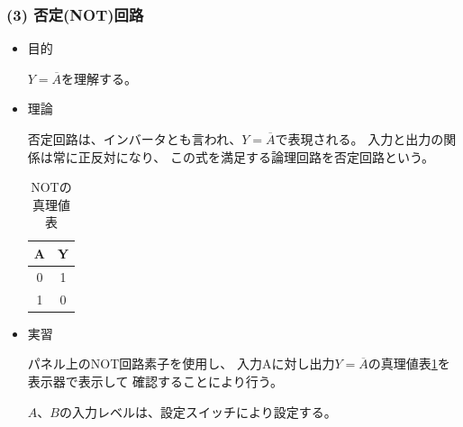 \documentclass[12pt]{jarticle}
\begin{document}
\subsubsection*{(3) 否定(NOT)回路}
\begin{itemize}
    \item 目的

          $Y = \overline{A}$を理解する。

    \item 理論

          否定回路は、インバータとも言われ、$Y = \overline{A}$で表現される。
          入力と出力の関係は常に正反対になり、
          この式を満足する論理回路を否定回路という。

          \begin{table}[h]
              \caption{NOTの真理値表}
              \begin{center}
                  \begin{tabular}{|c|c|}
                      \hline
                      A & Y \\
                      \hline
                      0 & 1 \\
                      \hline
                      1 & 0 \\
                      \hline
                  \end{tabular}
              \end{center}
              \label{table3}
          \end{table}

    \item 実習

          パネル上のNOT回路素子を使用し、
          入力Aに対し出力$Y = \overline{A}$の真理値表\ref{table3}を表示器で表示して
          確認することにより行う。

          $A$、$B$の入力レベルは、設定スイッチにより設定する。
\end{itemize}
\end{document}
